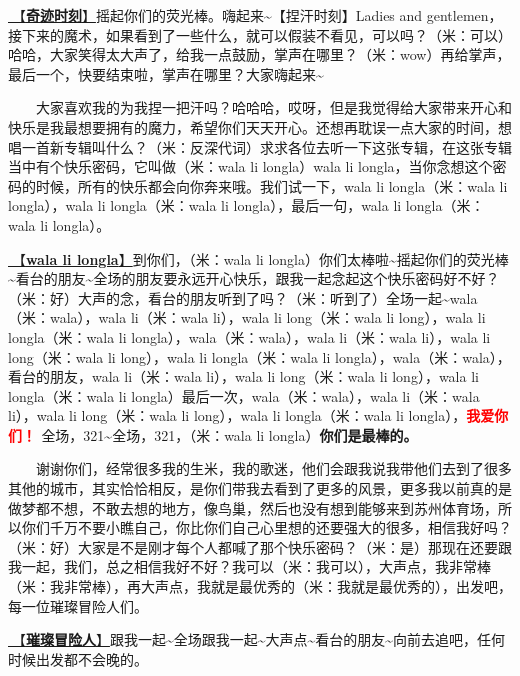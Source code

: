 \documentclass[]{ctexbook}
\begin{document}
\hyperref[magic-moment]{🎵【\textbf{奇迹时刻}】}摇起你们的荧光棒。嗨起来\textasciitilde【捏汗时刻】Ladies and gentlemen，接下来的魔术，如果看到了一些什么，就可以假装不看见，可以吗？（米：可以）哈哈，大家笑得太大声了，给我一点鼓励，掌声在哪里？（米：wow）再给掌声，最后一个，快要结束啦，掌声在哪里？大家嗨起来\textasciitilde{}

  大家喜欢我的为我捏一把汗吗？哈哈哈，哎呀，但是我觉得给大家带来开心和快乐是我最想要拥有的魔力，希望你们天天开心。还想再耽误一点大家的时间，想唱一首新专辑叫什么？（米：反深代词）求求各位去听一下这张专辑，在这张专辑当中有个快乐密码，它叫做（米：wala li longla）wala li longla，当你念想这个密码的时候，所有的快乐都会向你奔来哦。我们试一下，wala li longla（米：wala li longla），wala li longla（米：wala li longla），最后一句，wala li longla（米：wala li longla）。

\hyperref[wala-li-longla]{🎵【\textbf{wala li longla}】}到你们，（米：wala li longla）你们太棒啦\textasciitilde 摇起你们的荧光棒\textasciitilde 看台的朋友\textasciitilde 全场的朋友要永远开心快乐，跟我一起念起这个快乐密码好不好？（米：好）大声的念，看台的朋友听到了吗？（米：听到了）全场一起\textasciitilde wala（米：wala），wala li（米：wala li），wala li long（米：wala li long），wala li longla（米：wala li longla），wala（米：wala），wala li（米：wala li），wala li long（米：wala li long），wala li longla（米：wala li longla），wala（米：wala），看台的朋友，wala li（米：wala li），wala li long（米：wala li long），wala li longla（米：wala li longla）最后一次，wala（米：wala），wala li（米：wala li），wala li long（米：wala li long），wala li longla（米：wala li longla），\textbf{\textcolor{red}{我爱你们！ }}全场，321\textasciitilde 全场，321，（米：wala li longla）\textbf{你们是最棒的。}

  谢谢你们，经常很多我的生米，我的歌迷，他们会跟我说我带他们去到了很多其他的城市，其实恰恰相反，是你们带我去看到了更多的风景，更多我以前真的是做梦都不想，不敢去想的地方，像鸟巢，然后也没有想到能够来到苏州体育场，所以你们千万不要小瞧自己，你比你们自己心里想的还要强大的很多，相信我好吗？（米：好）大家是不是刚才每个人都喊了那个快乐密码？（米：是）那现在还要跟我一起，我们，总之相信我好不好？我可以（米：我可以），大声点，我非常棒（米：我非常棒），再大声点，我就是最优秀的（米：我就是最优秀的），出发吧，每一位璀璨冒险人们。

\hyperref[adventurers]{🎵【\textbf{璀璨冒险人}】}跟我一起\textasciitilde 全场跟我一起\textasciitilde 大声点\textasciitilde 看台的朋友\textasciitilde 向前去追吧，任何时候出发都不会晚的。
\end{document}
